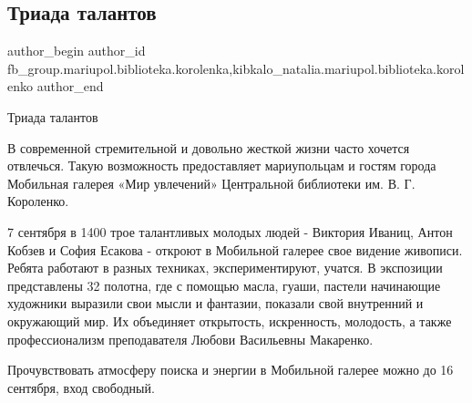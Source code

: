  
 
 
 
 

\subsection{Триада талантов}
\label{sec:07_09_2018.fb.fb_group.mariupol.biblioteka.korolenka.1.triada_talantov}
 
\ifcmt
 author_begin
   author_id fb_group.mariupol.biblioteka.korolenka,kibkalo_natalia.mariupol.biblioteka.korolenko
 author_end
\fi

Триада талантов

В современной стремительной и довольно жесткой жизни часто хочется отвлечься.
Такую возможность предоставляет мариупольцам и гостям города Мобильная галерея
«Мир увлечений» Центральной библиотеки им. В. Г. Короленко.

7 сентября в 1400 трое талантливых молодых людей - Виктория Иваниц, Антон
Кобзев и София Есакова - откроют  в Мобильной галерее свое видение живописи.
Ребята работают в разных техниках, экспериментируют, учатся. В экспозиции
представлены 32 полотна, где с помощью масла, гуаши, пастели начинающие
художники выразили свои мысли и фантазии, показали свой внутренний и окружающий
мир. Их объединяет открытость, искренность, молодость, а также профессионализм
преподавателя Любови Васильевны Макаренко. 

Прочувствовать атмосферу поиска и энергии в Мобильной галерее можно до 16
сентября, вход свободный.
